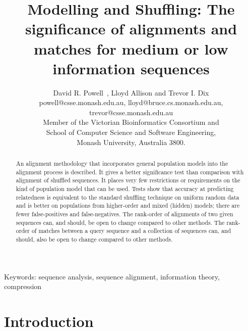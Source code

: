 \documentclass[letterpaper,11pt,oneside]{article}
\begin{document}
\title{Modelling and Shuffling: The significance of alignments and matches for
medium or low information sequences}

\author{
  David R. Powell\footnotemark[1]~, Lloyd Allison and Trevor I. Dix \\
{\small powell@csse.monash.edu.au, lloyd@bruce.cs.monash.edu.au, trevor@csse.monash.edu.au} \\
  Member of the Victorian Bioinformatics Consortium and \\
  School of Computer Science and Software Engineering, \\
  Monash University, Australia 3800.}

\renewcommand{\thefootnote}{\fnsymbol{footnote}}
\renewcommand{\thefootnote}{\arabic{footnote}}

\date{}
\maketitle



\begin{abstract}
An alignment methodology that incorporates general
population models into the alignment process is described.
It gives a better significance test than comparison with alignment of shuffled
sequences.
It places very few restrictions or requirements on the kind of
population model that can be used.
Tests show that accuracy at predicting relatedness is equivalent to
the standard shuffling technique on uniform random data and
is better on populations from higher-order and mixed (hidden) models;
there are fewer false-positives and false-negatives.
The rank-order of alignments of two given sequences can,
and should, be open to change compared to other methods.
The rank-order of matches between a query sequence and a collection of
sequences can, and should, also be open to change compared to other methods. 
\end{abstract}

{\small Keywords: sequence analysis, sequence alignment, information theory, compression}

\section{Introduction}
\label{sec:intro}
\end{document}
